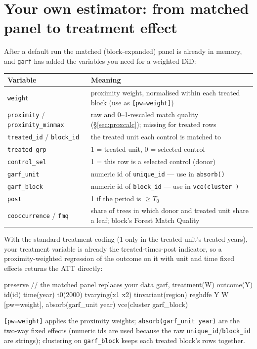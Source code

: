 \documentclass[11pt,a4paper]{article}
\newcommand{\code}[1]{\texttt{#1}}
\begin{document}
\section{Your own estimator: from matched panel to treatment effect}

After a default run the matched (block-expanded) panel is already in memory, and \code{garf} has
added the variables you need for a weighted DiD:
\begin{center}\small
\begin{tabularx}{0.96\textwidth}{@{}lX@{}}
\toprule
Variable & Meaning\\
\midrule
\code{weight} & proximity weight, normalised within each treated block (use as \code{[pw=weight]})\\
\code{proximity} / \code{proximity\_minmax} & raw and 0--1-rescaled match quality (\S\ref{sec:proxcalc}); missing for treated rows\\
\code{treated\_id} / \code{block\_id} & the treated unit each control is matched to\\
\code{treated\_grp} & 1 = treated unit, 0 = selected control\\
\code{control\_sel} & 1 = this row is a selected control (donor)\\
\code{garf\_unit} & numeric id of \code{unique\_id} --- use in \code{absorb()}\\
\code{garf\_block} & numeric id of \code{block\_id} --- use in \code{vce(cluster )}\\
\code{post} & 1 if the period is $\ge T_0$\\
\code{cooccurrence} / \code{fmq} & share of trees in which donor and treated unit share a leaf; block's Forest Match Quality\\
\bottomrule
\end{tabularx}
\end{center}

With the standard treatment coding (1 only in the treated unit's treated years), your treatment
variable is already the treated-times-post indicator, so a proximity-weighted regression of the
outcome on it with unit and time fixed effects returns the ATT directly:
\begin{stata}
preserve                                               // the matched panel replaces your data
garf, treatment(W) outcome(Y) id(id) time(year) t0(2000) tvarying(x1 x2) tinvariant(region)
reghdfe Y W [pw=weight], absorb(garf_unit year) vce(cluster garf_block)
\end{stata}
\code{[pw=weight]} applies the proximity weights; \code{absorb(garf\_unit year)} are the two-way
fixed effects (numeric ids are used because the raw \code{unique\_id}/\code{block\_id} are
strings); clustering on \code{garf\_block} keeps each treated block's rows together.
\end{document}
